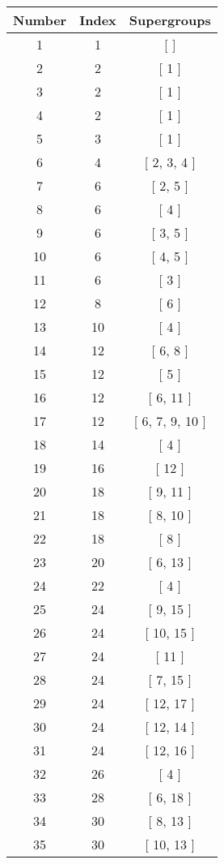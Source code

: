 \begin{center}
\begin{longtable}[H]{|| c c c ||}
\hline
Number & Index & Supergroups \\ 
\hline
1 & 1 & [  ] \\ 
\hline
2 & 2 & [ 1 ] \\ 
\hline
3 & 2 & [ 1 ] \\ 
\hline
4 & 2 & [ 1 ] \\ 
\hline
5 & 3 & [ 1 ] \\ 
\hline
6 & 4 & [ 2, 3, 4 ] \\ 
\hline
7 & 6 & [ 2, 5 ] \\ 
\hline
8 & 6 & [ 4 ] \\ 
\hline
9 & 6 & [ 3, 5 ] \\ 
\hline
10 & 6 & [ 4, 5 ] \\ 
\hline
11 & 6 & [ 3 ] \\ 
\hline
12 & 8 & [ 6 ] \\ 
\hline
13 & 10 & [ 4 ] \\ 
\hline
14 & 12 & [ 6, 8 ] \\ 
\hline
15 & 12 & [ 5 ] \\ 
\hline
16 & 12 & [ 6, 11 ] \\ 
\hline
17 & 12 & [ 6, 7, 9, 10 ] \\ 
\hline
18 & 14 & [ 4 ] \\ 
\hline
19 & 16 & [ 12 ] \\ 
\hline
20 & 18 & [ 9, 11 ] \\ 
\hline
21 & 18 & [ 8, 10 ] \\ 
\hline
22 & 18 & [ 8 ] \\ 
\hline
23 & 20 & [ 6, 13 ] \\ 
\hline
24 & 22 & [ 4 ] \\ 
\hline
25 & 24 & [ 9, 15 ] \\ 
\hline
26 & 24 & [ 10, 15 ] \\ 
\hline
27 & 24 & [ 11 ] \\ 
\hline
28 & 24 & [ 7, 15 ] \\ 
\hline
29 & 24 & [ 12, 17 ] \\ 
\hline
30 & 24 & [ 12, 14 ] \\ 
\hline
31 & 24 & [ 12, 16 ] \\ 
\hline
32 & 26 & [ 4 ] \\ 
\hline
33 & 28 & [ 6, 18 ] \\ 
\hline
34 & 30 & [ 8, 13 ] \\ 
\hline
35 & 30 & [ 10, 13 ] \\ 

\end{longtable}
\end{center}
